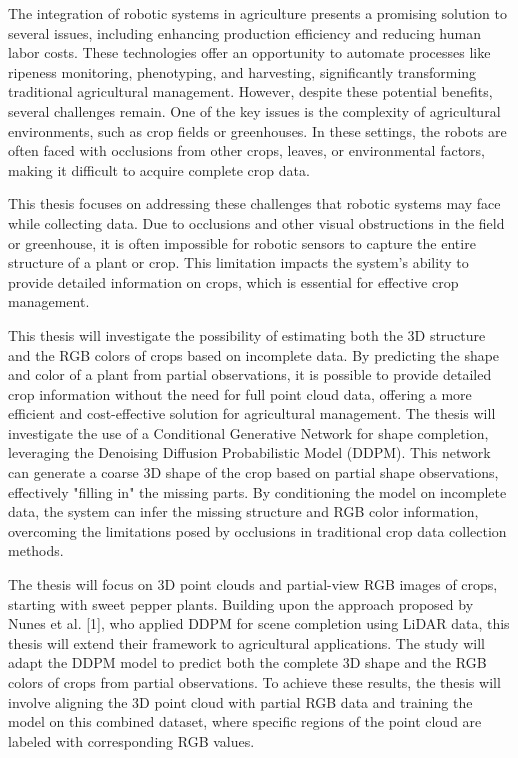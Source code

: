 \documentclass[11pt]{briefcd_3en}
\begin{document}
\begin{letter}{}
\opening{}

The integration of robotic systems in agriculture presents a promising solution to several issues, including enhancing production efficiency and reducing human labor costs. These technologies offer an opportunity to automate processes like ripeness monitoring, phenotyping, and harvesting, significantly transforming traditional agricultural management. However, despite these potential benefits, several challenges remain. One of the key issues is the complexity of agricultural environments, such as crop fields or greenhouses. In these settings, the robots are often faced with occlusions from other crops, leaves, or environmental factors, making it difficult to acquire complete crop data. 

This thesis focuses on addressing these challenges that robotic systems may face while collecting data. Due to occlusions and other visual obstructions in the field or greenhouse, it is often impossible for robotic sensors to capture the entire structure of a plant or crop. This limitation impacts the system's ability to provide detailed information on crops, which is essential for effective crop management. 

This thesis will investigate the possibility of estimating both the 3D structure and the RGB colors of crops based on incomplete data. By predicting the shape and color of a plant from partial observations, it is possible to provide detailed crop information without the need for full point cloud data, offering a more efficient and cost-effective solution for agricultural management. The thesis will investigate the use of a Conditional Generative Network for shape completion, leveraging the Denoising Diffusion Probabilistic Model (DDPM). This network can generate a coarse 3D shape of the crop based on partial shape observations, effectively "filling in" the missing parts. By conditioning the model on incomplete data, the system can infer the missing structure and RGB color information, overcoming the limitations posed by occlusions in traditional crop data collection methods.

The thesis will focus on 3D point clouds and partial-view RGB images of crops, starting with sweet pepper plants. Building upon the approach proposed by Nunes et al. [1], who applied DDPM for scene completion using LiDAR data, this thesis will extend their framework to agricultural applications. The study will adapt the DDPM model to predict both the complete 3D shape and the RGB colors of crops from partial observations. To achieve these results, the thesis will involve aligning the 3D point cloud with partial RGB data and training the model on this combined dataset, where specific regions of the point cloud are labeled with corresponding RGB values.


\end{letter}
\end{document}
